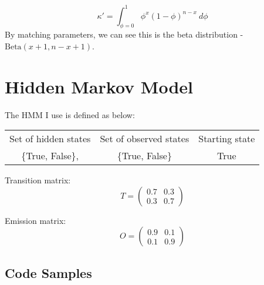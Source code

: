 \[\kappa'=\int_{\phi=0}^1\phi^x(1-\phi)^{n-x}~d\phi\]
By matching parameters, we can see this is the beta distribution - $\text{Beta}(x+1,n-x+1)$. 

\section{Hidden Markov Model} \label{app:hmm}
The HMM I use is defined as below:

\begin{table}[!h]
	\centering
	\begin{tabular}{ccc}
		Set of hidden states & Set of observed states & Starting state \\
		\{True, False\},     & \{True, False\}        & True           \\
	\end{tabular}
\end{table}



Transition matrix: 
\begin{equation}
	T=\begin{pmatrix}
	0.7 & 0.3 \\
	0.3 & 0.7 
	\end{pmatrix}
\end{equation}

Emission matrix: 
\begin{equation}
	O=\begin{pmatrix}
	0.9 & 0.1 \\
	0.1 & 0.9 
	\end{pmatrix}
\end{equation}
	
\subsection{Code Samples}
\begin{listing}[!htb]
	\centering
	\begin{minipage}{14.5cm}
	\end{minipage}
	\centering
	\begin{minipage}{12cm}
		\vspace{5mm}
	\end{minipage}
\end{listing}
\FloatBarrier

